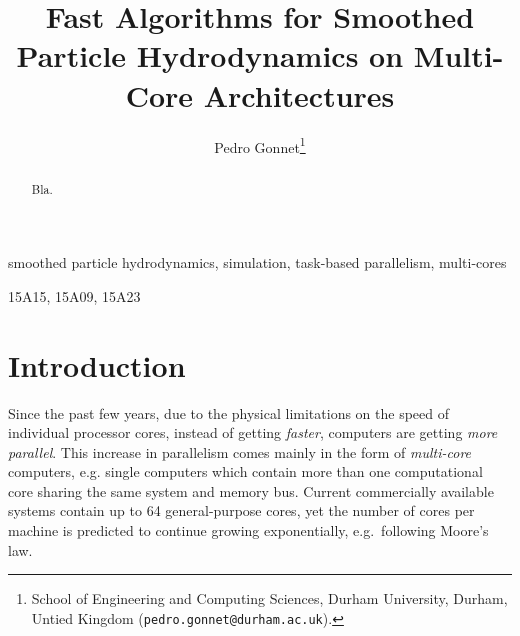 \documentclass[final]{siamltex}
\date{}
\title{Fast Algorithms for Smoothed Particle Hydrodynamics on Multi-Core
    Architectures}
\author{Pedro Gonnet\thanks{School of Engineering and Computing Sciences,
    Durham University, Durham, Untied Kingdom ({\tt pedro.gonnet@durham.ac.uk}).}}
\begin{document}
\lstset{%
    language=C,
    basicstyle=\small\tt,
    numbers=left,
    numberstyle=\tiny
    }


\maketitle


\begin{abstract}
Bla.
\end{abstract}


\begin{keywords} 
smoothed particle hydrodynamics,
simulation,
task-based parallelism,
multi-cores
\end{keywords}

\begin{AMS}
15A15, 15A09, 15A23
\end{AMS}

\pagestyle{myheadings}
\thispagestyle{plain}


\section{Introduction}

Since the past few years, due to the physical limitations
on the speed of individual processor cores, instead of
getting {\em faster}, computers are getting {\em more parallel}.
This increase in parallelism comes mainly in the form of
{\em multi-core} computers, e.g. single computers which
contain more than one computational core sharing the 
same system and memory bus.
Current commercially available systems contain up to 64
general-purpose cores, yet the number of cores per
machine is predicted to continue growing exponentially,
e.g.~following Moore's law.
\end{document}
